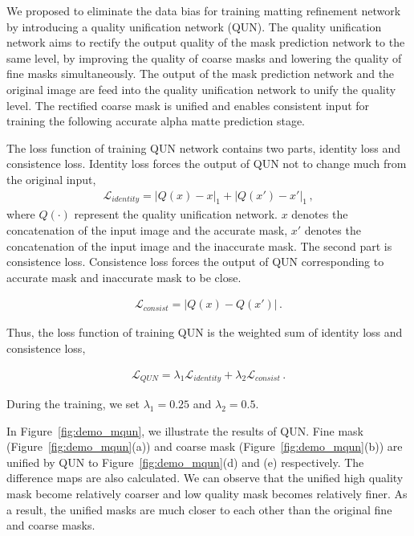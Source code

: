\documentclass[10pt,twocolumn,letterpaper]{article}
\begin{document}
We proposed to eliminate the data bias for training matting refinement network by introducing a quality unification network (QUN). The quality unification network aims to rectify the output quality of the mask prediction network to the same level, by improving the quality of coarse masks and lowering the quality of fine masks simultaneously. The output of the mask prediction network and the original image are feed into the quality unification network to unify the quality level. The rectified coarse mask is unified and enables consistent input for training the following accurate alpha matte prediction stage.

The loss function of training QUN network contains two parts, identity loss and consistence loss. Identity loss forces the output of QUN not to change much from the original input,
\begin{equation}
\begin{aligned}
\label{identity_loss}
\mathcal{L}_{identity}= |Q(x)-x|_1+|Q(x')-x'|_1\,,
\end{aligned}
\end{equation}
where $Q(\cdot)$ represent the quality unification network. $x$ denotes the concatenation of the input image and the accurate mask, $x'$ denotes the concatenation of the input image and the inaccurate mask. The second part is consistence loss. Consistence loss forces the output of QUN corresponding to accurate mask and inaccurate mask to be close.

\begin{equation}
\begin{aligned}
\label{consist_loss}
\mathcal{L}_{consist}=|Q(x)-Q(x')|\,.
\end{aligned}
\end{equation}

Thus, the loss function of training QUN is the weighted sum of identity loss and consistence loss,

\begin{equation}
\begin{aligned}
\label{QUN_loss}
\mathcal{L}_{QUN}= \lambda_1\mathcal{L}_{identity}+ \lambda_2\mathcal{L}_{consist}\,.
\end{aligned}
\end{equation}

During the training, we set $\lambda_1=0.25$ and  $\lambda_2=0.5$.

In Figure~\ref{fig:demo_mqun}, we illustrate the results of QUN. Fine mask (Figure~\ref{fig:demo_mqun}(a)) and coarse mask (Figure~\ref{fig:demo_mqun}(b)) are unified by QUN to Figure~\ref{fig:demo_mqun}(d) and (e) respectively. The difference maps are also calculated. We can observe that the unified high quality mask become relatively coarser and low quality mask becomes relatively finer. As a result, the unified masks are much closer to each other than the original fine and coarse masks.
\end{document}
